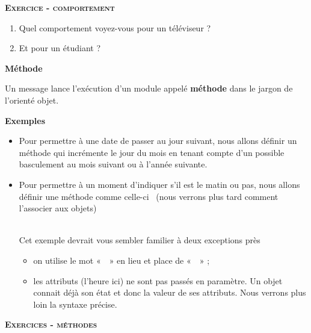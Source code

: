 {\sffamily\bfseries\scshape
Exercice - comportement}
{\begin{enumerate}
	\item {
	Quel comportement voyez-vous pour un téléviseur ?}
	\item {
	Et pour un étudiant ?}
\end{enumerate}}


\bigskip

{\sffamily\bfseries\upshape
Méthode}

{
Un message lance l'exécution d'un
module appelé \textbf{méthode} dans le jargon de
l'orienté objet. }

{\bfseries
Exemples}

\liststyleListv
\begin{itemize}
	\item {
	Pour permettre à une date de passer au jour suivant, nous allons définir
	un méthode qui incrémente le jour du mois en tenant compte
	d'un possible basculement au mois suivant ou à
	l'année suivante.}
	\item {
	Pour permettre à un moment d'indiquer
	s'il est le matin ou pas, nous allons définir une
	méthode comme celle-ci \ (nous verrons plus tard comment
	l'associer aux objets)}

	\bigskip

	\\
	\bigskip
	{
	Cet exemple devrait vous sembler familier à deux exceptions près}

	\liststyleListv
	\begin{itemize}
		\item {
		on utilise le mot «~~» en lieu et place de
		«~~» ;}
		\item {
		les attributs (l'heure ici) ne sont pas passés en
		paramètre. Un objet connait déjà son état et donc la valeur de ses
		attributs. Nous verrons plus loin la syntaxe précise.}
	\end{itemize}
\end{itemize}

{\sffamily\bfseries\scshape
Exercices - méthodes}

